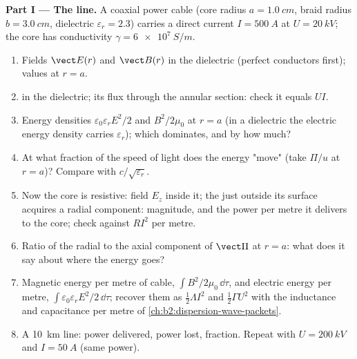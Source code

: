 \begin{problem}
\label{pb:b2:poynting-vector:1}

\medskip
\noindent\textbf{Part I --- The line.}
A coaxial power cable (core radius $a = \qty{1.0}{cm}$, braid radius $b =
\qty{3.0}{cm}$, dielectric $\varepsilon_r = 2.3$) carries a direct current $I =
\qty{500}{A}$ at $U = \qty{20}{kV}$; the core has conductivity $\gamma =
\qty{6e7}{S/m}$.
\begin{enumerate}
  \item Fields $\vect E(r)$ and $\vect B(r)$ in the dielectric (perfect
        conductors first); values at $r = a$.
  \item {} in the dielectric; its flux through the
        annular section: check it equals $UI$.
  \item Energy densities $\varepsilon_0\varepsilon_rE^2/2$ and $B^2/2\mu_0$ at $r = a$
        (in a dielectric the electric energy density carries $\varepsilon_r$);
        which dominates, and by how much?
  \item At what fraction of the speed of light does the energy "move"
        (take $\Pi/u$ at $r = a$)? Compare with $c/\sqrt{\varepsilon_r}$.
  \item Now the core is resistive: field $E_z$ inside it; the
         just outside its surface acquires a radial
        component: magnitude, and the power per metre it delivers to
        the core; check against $RI^2$ per metre.
  \item Ratio of the radial to the axial component of $\vect\Pi$ at $r =
        a$: what does it say about where the energy goes?
  \item Magnetic energy per metre of cable, $\int B^2/2\mu_0\,\dd\tau$, and
        electric energy per metre, $\int\varepsilon_0\varepsilon_rE^2/2\,\dd\tau$;
        recover them as $\tfrac12\Lambda I^2$ and $\tfrac12\Gamma U^2$ with the
        inductance and capacitance per metre of \cref{ch:b2:dispersion-wave-packets}.
  \item A \qty{10}{km} line: power delivered, power lost, fraction.
        Repeat with $U = \qty{200}{kV}$ and $I = \qty{50}{A}$ (same power).
\end{enumerate}


\end{problem}
